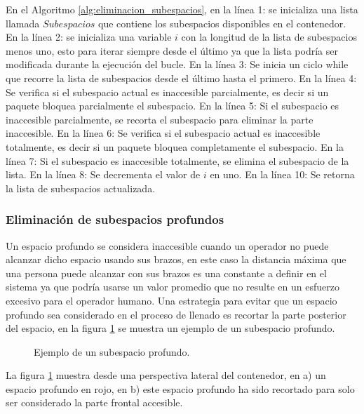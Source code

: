En el Algoritmo \ref{alg:eliminacion_subespacios}, en la línea 1: se inicializa una lista llamada $Subespacios$ que contiene los subespacios disponibles en el contenedor. En la línea 2: se inicializa una variable $i$ con la longitud de la lista de subespacios menos uno, esto para iterar siempre desde el último ya que la lista podría ser modificada durante la ejecución del bucle. En la línea 3: Se inicia un ciclo while que recorre la lista de subespacios desde el último hasta el primero. En la línea 4: Se verifica si el subespacio actual es inaccesible parcialmente, es decir si un paquete bloquea parcialmente el subespacio. En la línea 5: Si el subespacio es inaccesible parcialmente, se recorta el subespacio para eliminar la parte inaccesible. En la línea 6: Se verifica si el subespacio actual es inaccesible totalmente, es decir si un paquete bloquea completamente el subespacio. En la línea 7: Si el subespacio es inaccesible totalmente, se elimina el subespacio de la lista. En la línea 8: Se decrementa el valor de $i$ en uno. En la línea 10: Se retorna la lista de subespacios actualizada.

\subsubsection{Eliminación de subespacios profundos}

Un espacio profundo se considera inaccesible cuando un operador no puede alcanzar dicho espacio usando sus brazos, en este caso la distancia máxima que una persona puede alcanzar con sus brazos es una constante a definir en el sistema ya que podría usarse un valor promedio que no resulte en un esfuerzo excesivo para el operador humano. Una estrategia para evitar que un espacio profundo sea considerado en el proceso de llenado es recortar la parte posterior del espacio, en la figura \ref{fig:subespacio_profundo} se muestra un ejemplo de un subespacio profundo.

\begin{figure}[H]
    \centering
    
    \caption{Ejemplo de un subespacio profundo.}
    \label{fig:subespacio_profundo}
\end{figure}

La figura \ref{fig:subespacio_profundo} muestra desde una perspectiva lateral del contenedor, en a) un espacio profundo en rojo, en b) este espacio profundo ha sido recortado para solo ser considerado la parte frontal accesible.

